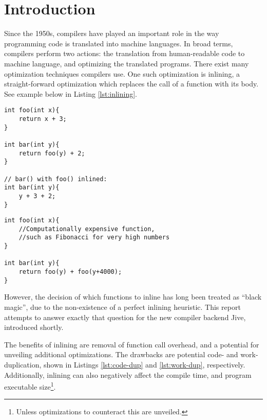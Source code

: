 
\section{Introduction}
\label{introduction}

Since the 1950s, compilers have played an important role in the way programming
code is translated into machine languages. In broad terms, compilers perform two
actions: the translation from human-readable code to machine language, and
optimizing the translated programs. There exist many optimization techniques
compilers use. One such optimization is inlining, a straight-forward
optimization which replaces the call of a function with its body. See example
below in Listing \ref{lst:inlining}.

\begin{center}
	\noindent\begin{minipage}{0.48\textwidth}
		\begin{lstlisting}[label={lst:inlining}, style=customcpp,
caption={Function \textit{foo()} inlined into function \textit{bar()}.}]
int foo(int x){
	return x + 3;
}

int bar(int y){
	return foo(y) + 2;
}

// bar() with foo() inlined:
int bar(int y){
	y + 3 + 2;
}
		\end{lstlisting}
	\end{minipage}
	\noindent\begin{minipage}{0.48\textwidth}
		\begin{lstlisting}[label={lst:work-dup}, style=customcpp,
caption={Work duplication in \textit{bar()}, when inlining \textit{foo()} into
\textit{bar()} due to the twice over calculation of \textit{foo(y)}.}]
int foo(int x){
	//Computationally expensive function,
	//such as Fibonacci for very high numbers
}

int bar(int y){
	return foo(y) + foo(y+4000);
}
		\end{lstlisting}
	\end{minipage}
\end{center}
However, the decision of which functions to inline has long been treated as
``black magic'', due to the non-existence of a perfect inlining heuristic. This
report attempts to answer exactly that question for the new compiler backend
Jive, introduced shortly.

The benefits of inlining are removal of function call overhead, and a potential
for unveiling additional optimizations. The drawbacks are potential code- and
work- duplication, shown in Listings \ref{lst:code-dup} and \ref{lst:work-dup},
respectively. Additionally, inlining can also negatively affect the compile
time, and program executable size\footnote{Unless optimizations to counteract
this are unveiled.}.

